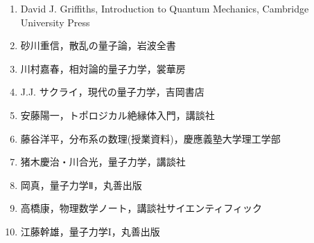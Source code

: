 \documentclass{report}
\begin{document}
  \begin{enumerate}
    \item David J. Griffiths, Introduction to Quantum Mechanics, Cambridge University Press
    \item 砂川重信，散乱の量子論，岩波全書
    \item 川村嘉春，相対論的量子力学，裳華房
    \item J.J. サクライ，現代の量子力学，吉岡書店
    \item 安藤陽一，トポロジカル絶縁体入門，講談社
    \item 藤谷洋平，分布系の数理(授業資料)，慶應義塾大学理工学部
    \item 猪木慶治・川合光，量子力学，講談社
    \item 岡真，量子力学Ⅱ，丸善出版
    \item 高橋康，物理数学ノート，講談社サイエンティフィック
    \item 江藤幹雄，量子力学I，丸善出版
  \end{enumerate}
\end{document}

